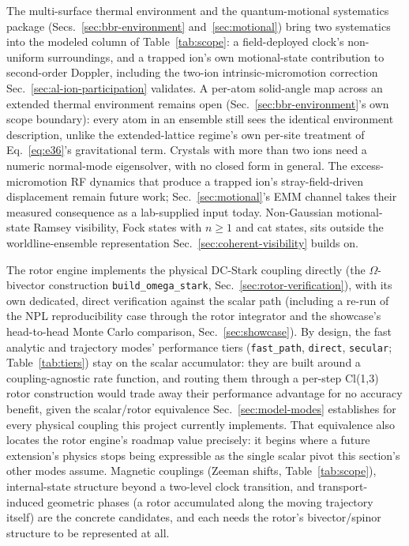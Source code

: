 \documentclass[aps,pra,superscriptaddress,groupedaddress,nofootinbib]{revtex4-2}
\begin{document}
The multi-surface thermal environment and the quantum-motional systematics
package (Secs.~\ref{sec:bbr-environment} and~\ref{sec:motional}) bring two
systematics into the modeled column of Table~\ref{tab:scope}: a
field-deployed clock's non-uniform surroundings, and a trapped ion's own
motional-state contribution to second-order Doppler, including the two-ion
intrinsic-micromotion correction Sec.~\ref{sec:al-ion-participation}
validates. A per-atom solid-angle map across an extended thermal
environment remains open (Sec.~\ref{sec:bbr-environment}'s own scope
boundary): every atom in an ensemble still sees the identical environment
description, unlike the extended-lattice regime's own per-site treatment of
Eq.~\eqref{eq:e36}'s gravitational term. Crystals with more than two
ions need a numeric normal-mode eigensolver, with no closed form in
general. The excess-micromotion RF dynamics that produce a trapped ion's
stray-field-driven displacement remain future work; Sec.~\ref{sec:motional}'s
EMM channel takes their measured consequence as a lab-supplied input today.
Non-Gaussian motional-state Ramsey visibility, Fock states with $n\ge1$ and
cat states, sits outside the worldline-ensemble representation
Sec.~\ref{sec:coherent-visibility} builds on.

The rotor engine implements the physical DC-Stark coupling directly (the
$\Omega$-bivector construction \texttt{build\_omega\_stark},
Sec.~\ref{sec:rotor-verification}), with its own dedicated, direct verification
against the scalar path (including a re-run of the NPL reproducibility
case through the rotor integrator and the showcase's head-to-head Monte
Carlo comparison, Sec.~\ref{sec:showcase}). By design, the fast analytic
and trajectory modes' performance tiers (\texttt{fast\_path},
\texttt{direct}, \texttt{secular}; Table~\ref{tab:tiers}) stay on the
scalar accumulator: they are built around a coupling-agnostic rate
function, and routing them through a per-step Cl(1,3) rotor construction
would trade away their performance advantage for no accuracy benefit,
given the scalar/rotor equivalence Sec.~\ref{sec:model-modes} establishes
for every physical coupling this project currently implements. That
equivalence also locates the rotor engine's roadmap value precisely: it
begins where a future extension's physics stops being expressible as
the single scalar pivot this section's other
modes assume. Magnetic couplings (Zeeman shifts, Table~\ref{tab:scope}),
internal-state structure beyond a two-level clock transition, and
transport-induced geometric phases (a rotor accumulated along the
moving trajectory itself) are the
concrete candidates, and each needs the rotor's bivector/spinor
structure to be represented at all.
\end{document}
